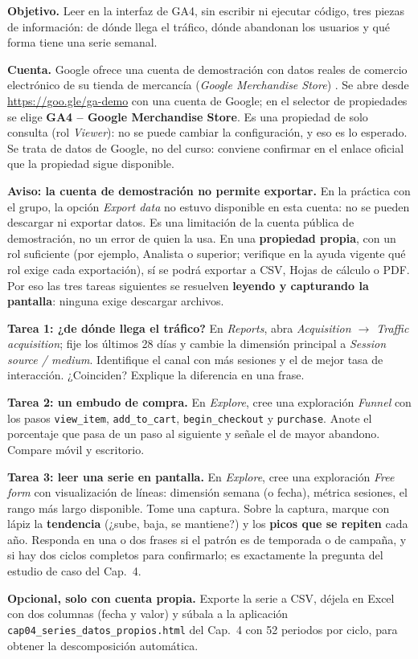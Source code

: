 \begin{cajaLaboratorio}[title={Laboratorio en pantalla (sin código)}]
\textbf{Objetivo.} Leer en la interfaz de GA4, sin escribir ni ejecutar código,
tres piezas de información: de dónde llega el tráfico, dónde abandonan los
usuarios y qué forma tiene una serie semanal.

\textbf{Cuenta.} Google ofrece una cuenta de demostración con datos reales de
comercio electrónico de su tienda de mercancía (\textit{Google Merchandise
Store}) \parencite{google2026ga4demo}. Se abre desde \url{https://goo.gle/ga-demo}
con una cuenta de Google; en el selector de propiedades se elige
\textbf{GA4 -- Google Merchandise Store}. Es una propiedad de solo consulta
(rol \textit{Viewer}): no se puede cambiar la configuración, y eso es lo
esperado. Se trata de datos de Google, no del curso: conviene confirmar en el
enlace oficial que la propiedad sigue disponible.

\textbf{Aviso: la cuenta de demostración no permite exportar.} En la práctica
con el grupo, la opción \textit{Export data} no estuvo disponible en esta
cuenta: no se pueden descargar ni exportar datos. Es una limitación de la
cuenta pública de demostración, no un error de quien la usa. En una
\textbf{propiedad propia}, con un rol suficiente (por ejemplo, Analista o
superior; verifique en la ayuda vigente qué rol exige cada exportación), sí se
podrá exportar a CSV, Hojas de cálculo o PDF. Por eso las tres tareas
siguientes se resuelven \textbf{leyendo y capturando la pantalla}: ninguna
exige descargar archivos.

\textbf{Tarea 1: ¿de dónde llega el tráfico?} En \textit{Reports}, abra
\textit{Acquisition $\rightarrow$ Traffic acquisition}; fije los últimos 28
días y cambie la dimensión principal a \textit{Session source / medium}.
Identifique el canal con más sesiones y el de mejor tasa de interacción.
¿Coinciden? Explique la diferencia en una frase.

\textbf{Tarea 2: un embudo de compra.} En \textit{Explore}, cree una
exploración \textit{Funnel} con los pasos \texttt{view\_item},
\texttt{add\_to\_cart}, \texttt{begin\_checkout} y \texttt{purchase}. Anote el
porcentaje que pasa de un paso al siguiente y señale el de mayor abandono.
Compare móvil y escritorio.

\textbf{Tarea 3: leer una serie en pantalla.} En \textit{Explore}, cree una
exploración \textit{Free form} con visualización de líneas: dimensión semana
(o fecha), métrica sesiones, el rango más largo disponible. Tome una captura.
Sobre la captura, marque con lápiz la \textbf{tendencia} (¿sube, baja, se
mantiene?) y los \textbf{picos que se repiten} cada año. Responda en una o dos
frases si el patrón es de temporada o de campaña, y si hay dos ciclos
completos para confirmarlo; es exactamente la pregunta del estudio de caso
del Cap.~4.

\textbf{Opcional, solo con cuenta propia.} Exporte la serie a CSV, déjela en
Excel con dos columnas (fecha y valor) y súbala a la aplicación
\texttt{cap04\_series\_datos\_propios.html} del Cap.~4 con 52 periodos por
ciclo, para obtener la descomposición automática.
\end{cajaLaboratorio}

